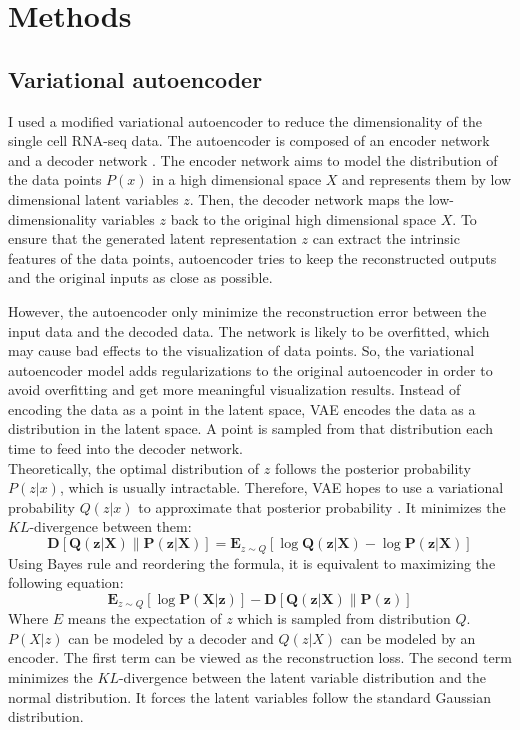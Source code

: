\section{Methods}
\subsection{Variational autoencoder}
I used a modified variational autoencoder \cite{Kingma2014} to reduce the dimensionality of the single cell RNA-seq data. The autoencoder is composed of an encoder network and a decoder network \cite{wang2016auto}. The encoder network aims to model the distribution of the data points $P(x)$ in a high dimensional space $X$ and represents them by low dimensional latent variables $z$. Then, the decoder network maps the low-dimensionality variables $z$ back to the original high dimensional space $X$. To ensure that the generated latent representation $z$ can extract the intrinsic features of the data points, autoencoder tries to keep the reconstructed outputs and the original inputs as close as possible. 

However, the autoencoder only minimize the reconstruction error between the input data and the decoded data. The network is likely to be overfitted, which may cause bad effects to the visualization of data points. So, the variational autoencoder model adds regularizations to the original autoencoder in order to avoid overfitting and get more meaningful visualization results. Instead of encoding the data as a point in the latent space, VAE encodes the data as a distribution in the latent space. A point is sampled from that distribution each time to feed into the decoder network. \\
Theoretically, the optimal distribution of $z$ follows the posterior probability $P(z|x)$, which is usually intractable. Therefore, VAE hopes to use a variational probability $Q(z|x)$ to approximate that posterior probability \cite{doersch2016tutorial}. It minimizes the $KL$-divergence between them:
\begin{equation}
\boldsymbol{D}[\boldsymbol{Q}(\boldsymbol{z} | \boldsymbol{X}) \| \boldsymbol{P}(\boldsymbol{z} | \boldsymbol{X})]=\mathbf{E}_{z \sim Q}[\log \boldsymbol{Q}(\boldsymbol{z} | \boldsymbol{X})-\log \boldsymbol{P}(\boldsymbol{z} | \boldsymbol{X})]
\end{equation}
Using Bayes rule and reordering the formula, it is equivalent to maximizing the following equation:
\begin{equation}
\mathbf{E}_{z \sim Q}[\log \boldsymbol{P}(\boldsymbol{X} | \boldsymbol{z})]-\boldsymbol{D}[\boldsymbol{Q}(\boldsymbol{z} | \boldsymbol{X}) \| \boldsymbol{P}(\boldsymbol{z})]
\end{equation}
Where $E$ means the expectation of $z$ which is sampled from distribution $Q$. $P(X|z)$ can be modeled by a decoder and $Q(z|X)$ can be modeled by an encoder. The first term can be viewed as the reconstruction loss. The second term minimizes the $KL$-divergence between the latent variable distribution and the normal distribution. It forces the latent variables follow the standard Gaussian distribution.
